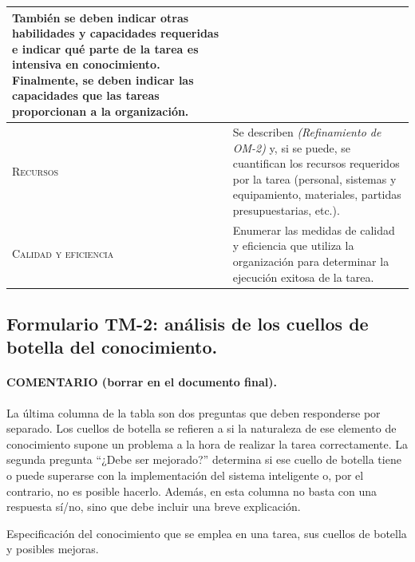 \documentclass[12pt,a4paper,twoside,spanish]{article}      %
\begin{document}
\begin{table}[H]
\begin{tabularx}{\textwidth}{|l|X|}
También se deben indicar otras habilidades y capacidades
requeridas e indicar qué parte de la tarea es intensiva en
conocimiento. Finalmente, se deben indicar las capacidades
que las tareas proporcionan a la organización. \\ \hline
\textsc{Recursos} &
Se describen \emph{(Refinamiento de OM-2)} y, si se puede, se cuantifican los recursos
requeridos por la tarea (personal, sistemas y equipamiento,
materiales, partidas presupuestarias, etc.). \\ \hline
\textsc{Calidad y eficiencia} &
Enumerar las medidas de calidad y eficiencia que utiliza la
organización para determinar la ejecución exitosa de la
tarea.
\\ \hline
\end{tabularx}

  \label{tab.TM1}
\end{table}



\pagebreak
\subsection{Formulario TM-2: análisis de los cuellos de botella del conocimiento.}

\paragraph{COMENTARIO (borrar en el documento final).} La última columna de la tabla son dos preguntas que deben responderse por separado. Los cuellos de botella se refieren a si la naturaleza de ese elemento de conocimiento supone un problema a la hora de realizar la tarea correctamente. La segunda pregunta ``¿Debe ser mejorado?'' determina si ese cuello de botella tiene o puede superarse con la implementación del sistema inteligente o, por el contrario, no es posible hacerlo. Además, en esta columna no basta con una respuesta sí/no, sino que debe incluir una breve explicación.

Especificación del conocimiento que se emplea en una tarea, sus cuellos de botella y posibles mejoras.
\end{document}
